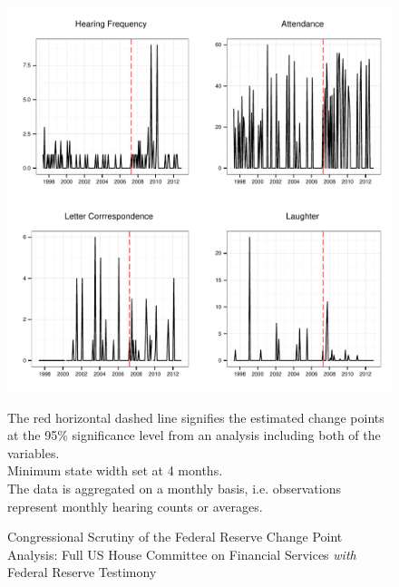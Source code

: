\documentclass[a4paper]{article}\usepackage[]{graphicx}\usepackage[]{color}
\makeatletter
\def\maxwidth{ %
  \ifdim\Gin@nat@width>\linewidth
    \linewidth
  \else
    \Gin@nat@width
  \fi
}
\newenvironment{knitrout}{}{} %
\makeatother
\begin{document}
\begin{figure}
    \caption{Congressional Scrutiny of the Federal Reserve Change Point Analysis: Full US House Committee on Financial Services \emph{with} Federal Reserve Testimony}
    \label{fig:HouseFedCP}
\begin{knitrout}
\color{fgcolor}

{\centering \includegraphics[width=\maxwidth]{figure/ScrutinyHouseFedCP} 

}



\end{knitrout}
{\scriptsize{The red horizontal dashed line signifies the estimated change points at the 95\% significance level from an analysis including both of the variables.\\
Minimum state width set at 4 months. \\
The data is aggregated on a monthly basis, i.e. observations represent monthly hearing counts or averages.}}
\end{figure}
\end{document}
